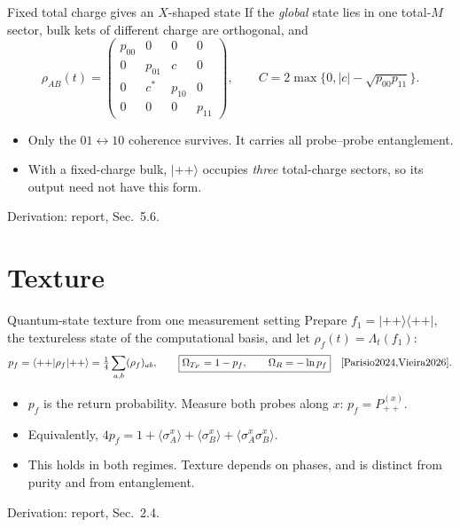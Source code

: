 \documentclass[aspectratio=169,11pt]{beamer}
\newcommand{\ket}[1]{\lvert #1\rangle}
\newcommand{\bra}[1]{\langle #1\rvert}
\newcommand{\report}[1]{{\color{muted}\footnotesize Derivation: report, #1.}}
\begin{document}
\begin{frame}{Fixed total charge gives an $X$-shaped state}
If the \emph{global} state lies in one total-$M$ sector, bulk kets of
different charge are orthogonal, and
\[
\rho_{AB}(t)=\begin{pmatrix}
p_{00}&0&0&0\\
0&p_{01}&c&0\\
0&c^*&p_{10}&0\\
0&0&0&p_{11}
\end{pmatrix},\qquad
C=2\max\{0,|c|-\sqrt{p_{00}p_{11}}\}.
\]
\begin{itemize}\setlength\itemsep{6pt}
\item Only the $01\leftrightarrow10$ coherence survives. It carries all
probe--probe entanglement.
\item With a fixed-charge bulk, $\ket{++}$ occupies \emph{three} total-charge
sectors, so its output need not have this form.
\end{itemize}
\report{Sec.~5.6}
\end{frame}

\section{Texture}

\begin{frame}{Quantum-state texture from one measurement setting}
Prepare $f_1=\ket{++}\bra{++}$, the textureless state of the
computational basis, and let $\rho_f(t)=\Lambda_t(f_1)$:
\[
p_f=\bra{++}\rho_f\ket{++}=\tfrac14\sum_{a,b}(\rho_f)_{ab},\qquad
\boxed{\Omega_{T_F}=1-p_f,\qquad \Omega_R=-\ln p_f}
\quad\text{\cite{Parisio2024,Vieira2026}.}
\]
\begin{itemize}\setlength\itemsep{6pt}
\item $p_f$ is the return probability. Measure both probes along $x$:
$p_f=P^{(x)}_{++}$.
\item Equivalently,
$4p_f=1+\langle\sigma_A^x\rangle+\langle\sigma_B^x\rangle+\langle\sigma_A^x\sigma_B^x\rangle$.
\item This holds in both regimes. Texture depends on phases, and is distinct
from purity and from entanglement.
\end{itemize}
\report{Sec.~2.4}
\end{frame}
\end{document}
